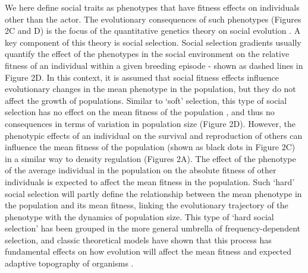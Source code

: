 \documentclass{article}
\begin{document}
We here define social traits as phenotypes that have fitness effects on individuals other than the actor. The evolutionary consequences of such phenotypes  (Figures 2C and D) is the focus of the quantitative genetics theory on social evolution \citep{frank1998foundations, Araya-Ajoy2020}. A key component of this theory is social selection. Social selection gradients usually quantify the effect of the phenotypes in the social environment on the relative fitness of an individual within a given breeding episode \citep{Wolf1999SocialSelection} - shown as dashed lines in Figure 2D. In this context, it is assumed that social fitness effects influence evolutionary changes in the mean phenotype in the population, but they do not affect the growth of populations. Similar to `soft' selection, this type of social selection has no effect on the mean fitness of the population \citep{Goodnight1992}, and thus no consequences in terms of variation in population size (Figure 2D). However, the phenotypic effects of an individual on the survival and reproduction of others can influence the mean fitness of the population (shown as black dots in Figure 2C) in a similar way to density regulation (Figures 2A). The effect of the phenotype of the average individual in the population on the absolute fitness of other individuals is expected to affect the mean fitness in the population. Such `hard' social selection will partly define the relationship between the mean phenotype in the population and its mean fitness, linking the evolutionary trajectory of the phenotype with the dynamics of population size. This type of `hard social selection' has been grouped in the more general umbrella of frequency-dependent selection, and classic theoretical models have shown that this process has fundamental effects on how evolution will affect the mean fitness and expected adaptive topography of organisms \citep{Wright1969}.
 
\end{document}

